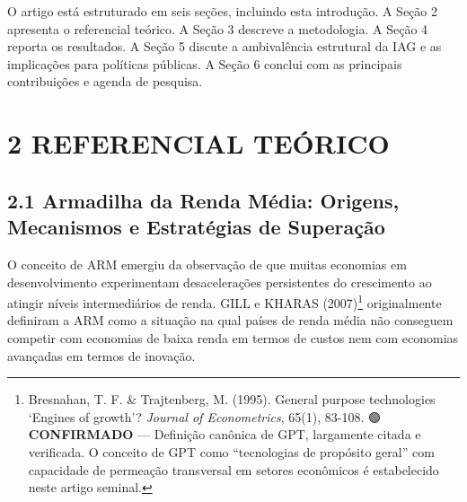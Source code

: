 \documentclass[
  brazilian,
  12pt,
]{article}
\begin{document}
O artigo está estruturado em seis seções, incluindo esta introdução. A Seção 2 apresenta o referencial teórico. A Seção 3 descreve a metodologia. A Seção 4 reporta os resultados. A Seção 5 discute a ambivalência estrutural da IAG e as implicações para políticas públicas. A Seção 6 conclui com as principais contribuições e agenda de pesquisa.

\newpage

\section{2 REFERENCIAL TEÓRICO}\label{referencial-teuxf3rico}

\subsection{2.1 Armadilha da Renda Média: Origens, Mecanismos e Estratégias de Superação}\label{armadilha-da-renda-muxe9dia-origens-mecanismos-e-estratuxe9gias-de-superauxe7uxe3o}

O conceito de ARM emergiu da observação de que muitas economias em desenvolvimento experimentam desacelerações persistentes do crescimento ao atingir níveis intermediários de renda. GILL e KHARAS (2007)\footnote{Bresnahan, T. F. \& Trajtenberg, M. (1995). General purpose technologies `Engines of growth'? \emph{Journal of Econometrics}, 65(1), 83-108. 🟢 \textbf{CONFIRMADO} --- Definição canônica de GPT, largamente citada e verificada. O conceito de GPT como ``tecnologias de propósito geral'' com capacidade de permeação transversal em setores econômicos é estabelecido neste artigo seminal.} originalmente definiram a ARM como a situação na qual países de renda média não conseguem competir com economias de baixa renda em termos de custos nem com economias avançadas em termos de inovação.
\end{document}

